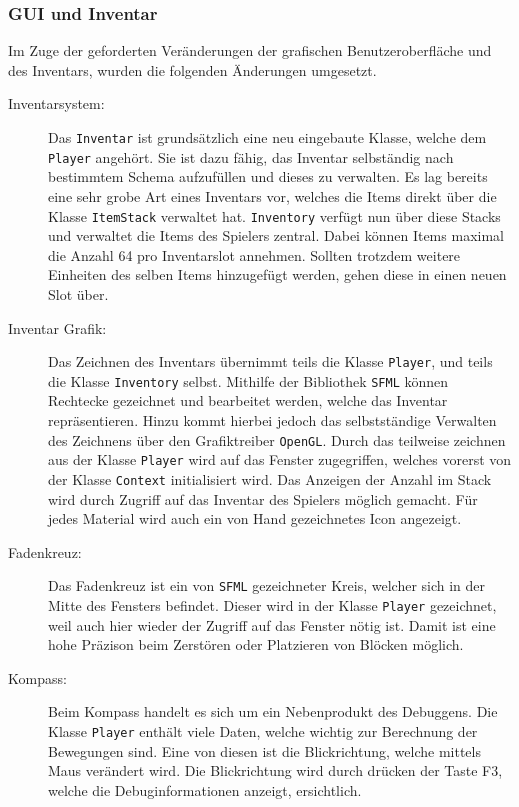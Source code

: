 \documentclass{article}
\begin{document}
\subsubsection{GUI und Inventar}

Im Zuge der geforderten Veränderungen der grafischen Benutzeroberfläche und des Inventars, wurden die folgenden Änderungen umgesetzt.

\begin{description}
  \item[Inventarsystem:] Das \texttt{Inventar} ist grundsätzlich eine neu eingebaute Klasse, welche dem \texttt{Player} angehört. Sie ist dazu fähig, das Inventar selbständig nach bestimmtem Schema aufzufüllen und dieses zu verwalten. Es lag bereits eine sehr grobe Art eines Inventars vor, welches die Items direkt über die Klasse \texttt{ItemStack} verwaltet hat. \texttt{Inventory} verfügt nun über diese Stacks und verwaltet die Items des Spielers zentral. Dabei können Items maximal die Anzahl 64 pro Inventarslot annehmen. Sollten trotzdem weitere Einheiten des selben Items hinzugefügt werden, gehen diese in einen neuen Slot über.
  \item[Inventar Grafik:] Das Zeichnen des Inventars übernimmt teils die Klasse \linebreak[4]\texttt{Player}, und teils die Klasse \texttt{Inventory} selbst. Mithilfe der Bibliothek \texttt{SFML} können Rechtecke gezeichnet und bearbeitet werden, welche das Inventar repräsentieren. Hinzu kommt hierbei jedoch das selbstständige Verwalten des Zeichnens über den Grafiktreiber \texttt{OpenGL}. Durch das teilweise zeichnen aus der Klasse \texttt{Player} wird auf das Fenster zugegriffen, welches vorerst von der Klasse \texttt{Context} initialisiert wird. Das Anzeigen der Anzahl im Stack wird durch Zugriff auf das Inventar des Spielers möglich gemacht. Für jedes Material wird auch ein von Hand gezeichnetes Icon angezeigt.
  \item[Fadenkreuz:] Das Fadenkreuz ist ein von \texttt{SFML} gezeichneter Kreis, welcher sich in der Mitte des Fensters befindet. Dieser wird in der Klasse \texttt{Player} gezeichnet, weil auch hier wieder der Zugriff auf das Fenster nötig ist. Damit ist eine hohe Präzison beim Zerstören oder Platzieren von Blöcken möglich.
  \item[Kompass:] Beim Kompass handelt es sich um ein Nebenprodukt des Debuggens. Die Klasse \texttt{Player} enthält viele Daten, welche wichtig zur Berechnung der Bewegungen sind. Eine von diesen ist die Blickrichtung, welche mittels Maus verändert wird. Die Blickrichtung wird durch drücken der Taste F3, welche die Debuginformationen anzeigt, ersichtlich. 
\end{description}
\end{document}
